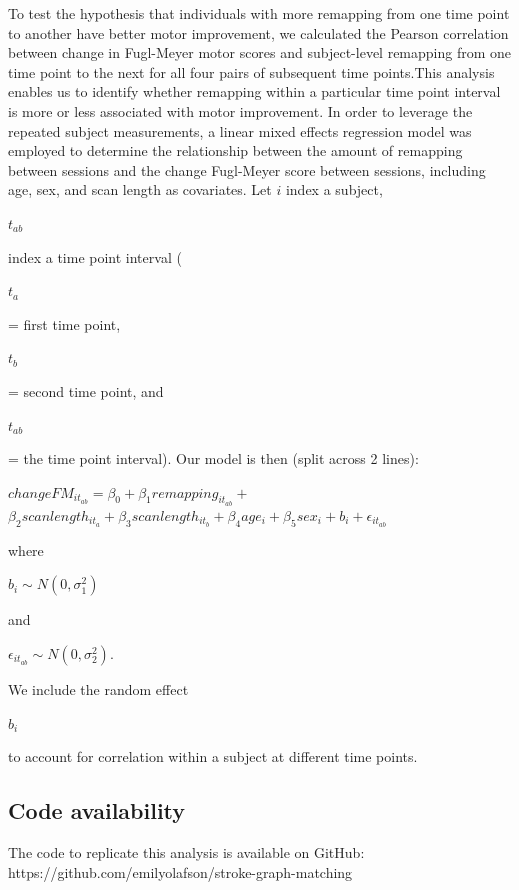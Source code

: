 \documentclass[phd,tocprelim]{cornell}
\begin{document}
	To test the hypothesis that individuals with more remapping from one time point to another have better motor improvement, we calculated the Pearson correlation between change in Fugl-Meyer motor scores and subject-level remapping from one time point to the next for all four pairs of subsequent time points.This analysis enables us to identify whether remapping within a particular time point interval is more or less associated with motor improvement. In order to leverage the repeated subject measurements, a linear mixed effects regression model was employed to determine the relationship between the amount of remapping between sessions and the change Fugl-Meyer score between sessions, including age, sex, and scan length as covariates.  Let $i$ index a subject, \begin{Large}$t_{ab}$\end{Large} index a time point interval (\begin{Large}$t_a$\end{Large} = first time point, \begin{Large}$t_b$\end{Large} = second time point, and  \begin{Large}$t_{ab}$\end{Large} = the time point interval). Our model is then (split across 2 lines): 
	
	\begin{Large}
	\begin{center}

	$changeFM_{it_{ab}} =  \beta_0 + \beta_1 remapping_{it_{ab}} + $
	$ \beta_2 scan length_{it_a} +\beta_3 scan length_{it_b} + \beta_4 age_i + \beta_5 sex_i + b_i + \epsilon_{it_{ab}}$

	\end{center}
	\end{Large}
	\noindent where \begin{Large}$b_i \sim N(0, \sigma_1^2)$ \end{Large} and \begin{Large}$\epsilon_{it_{ab}} \sim N(0, \sigma_2^2)$.\end{Large}  We include the random effect \begin{Large}$b_i$\end{Large} to account for correlation within a subject at different time points. 

	\subsection{Code availability}
	 The code to replicate this analysis is available on GitHub: https://github.com/emilyolafson/stroke-graph-matching
	
\end{document}
